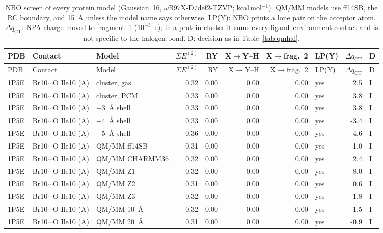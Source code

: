{\scriptsize
\setlength{\tabcolsep}{3pt}
\begin{longtable}{lllrrrrlrl}
\caption{NBO screen of every protein model (Gaussian~16, $\omega$B97X-D/def2-TZVP; kcal\,mol$^{-1}$). QM/MM models use ff14SB, the RC boundary, and \SI{15}{\angstrom} unless the model name says otherwise. LP(Y): NBO prints a lone pair on the acceptor atom. $\Delta q_\mathrm{CT}$: NPA charge moved to fragment~1 ($10^{-3}$~e); in a protein cluster it sums every ligand--environment contact and is not specific to the halogen bond. D: decision as in Table~\ref{tab:qmhal}.}\label{tab:qmprot}\\
\toprule
PDB & Contact & Model & $\Sigma E^{(2)}$ & RY & X$\to$Y--H & X$\to$frag.~2 & LP(Y) & $\Delta q_\mathrm{CT}$ & D\\
\midrule
\endfirsthead
\toprule
PDB & Contact & Model & $\Sigma E^{(2)}$ & RY & X$\to$Y--H & X$\to$frag.~2 & LP(Y) & $\Delta q_\mathrm{CT}$ & D\\
\midrule
\endhead
\bottomrule
\endlastfoot
1P5E & Br10$\cdots$O Ile10 (A) & cluster, gas & 0.32 & 0.00 & 0.00 & 0.00 & yes & 2.5 & I\\
1P5E & Br10$\cdots$O Ile10 (A) & cluster, PCM & 0.33 & 0.00 & 0.00 & 0.00 & yes & 3.8 & I\\
1P5E & Br10$\cdots$O Ile10 (A) & +3~\AA{} shell & 0.33 & 0.00 & 0.00 & 0.00 & yes & 3.8 & I\\
1P5E & Br10$\cdots$O Ile10 (A) & +4~\AA{} shell & 0.33 & 0.00 & 0.00 & 0.00 & yes & -3.4 & I\\
1P5E & Br10$\cdots$O Ile10 (A) & +5~\AA{} shell & 0.36 & 0.00 & 0.00 & 0.00 & yes & -4.6 & I\\
1P5E & Br10$\cdots$O Ile10 (A) & QM/MM ff14SB & 0.31 & 0.00 & 0.00 & 0.00 & yes & 1.0 & I\\
1P5E & Br10$\cdots$O Ile10 (A) & QM/MM CHARMM36 & 0.32 & 0.00 & 0.00 & 0.00 & yes & 2.4 & I\\
1P5E & Br10$\cdots$O Ile10 (A) & QM/MM Z1 & 0.32 & 0.00 & 0.00 & 0.00 & yes & 8.0 & I\\
1P5E & Br10$\cdots$O Ile10 (A) & QM/MM Z2 & 0.31 & 0.00 & 0.00 & 0.00 & yes & 0.6 & I\\
1P5E & Br10$\cdots$O Ile10 (A) & QM/MM Z3 & 0.32 & 0.00 & 0.00 & 0.00 & yes & 1.8 & I\\
1P5E & Br10$\cdots$O Ile10 (A) & QM/MM 10~\AA{} & 0.32 & 0.00 & 0.00 & 0.00 & yes & 1.5 & I\\
1P5E & Br10$\cdots$O Ile10 (A) & QM/MM 20~\AA{} & 0.31 & 0.00 & 0.00 & 0.00 & yes & -0.9 & I\\

\end{longtable}}

